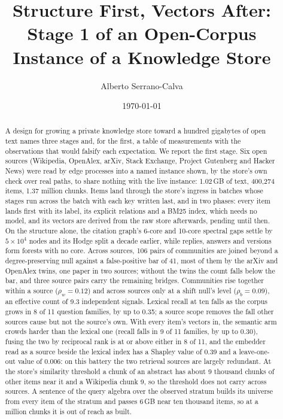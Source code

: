 \documentclass[11pt]{article}
\title{Structure First, Vectors After:\\ Stage 1 of an Open-Corpus Instance of a Knowledge Store}
\author{Alberto Serrano-Calva}
\date{\today}
\theoremstyle{plain}
\theoremstyle{definition}
\theoremstyle{remark}
\begin{document}
\maketitle

\begin{abstract}
A design for growing a private knowledge store toward a hundred gigabytes of open text names three
stages and, for the first, a table of measurements with the observations that would falsify each
expectation. We report the first stage. Six open sources (Wikipedia, OpenAlex, arXiv, Stack Exchange, Project Gutenberg and Hacker News)  were read by edge processes into a named
instance shown, by the store's own check over real paths, to share nothing with the live instance:
1.02\,GB of text, 400,274 items, 1.37 million chunks. Items land through the store's ingress in
batches whose stages run across the batch with each key written last, and in two phases: every item
lands first with its label, its explicit relations and a BM25 index, which needs no model, and its
vectors are derived from the raw store afterwards, pending until then. On the structure alone, the
citation graph's 6-core and 10-core spectral gaps settle by $5\times10^4$ nodes and its Hodge split a
decade earlier, while replies, answers and versions form forests with no core. Across sources, 106
pairs of communities are joined beyond a degree-preserving null against a false-positive bar of 41,
most of them by the arXiv and OpenAlex twins, one paper in two sources; without the twins the count
falls below the bar, and three source pairs carry the remaining bridges. Communities rise together
within a source ($\rho_w = 0.12$) and across sources only at a shift null's level ($\rho_b = 0.09$),
an effective count of 9.3 independent signals. Lexical recall at ten falls as the corpus grows in 8 of
11 question families, by up to 0.35; a source scope removes the fall other sources cause but not the
source's own. With every item's vectors in, the semantic arm crowds harder than the lexical one (recall falls in 9 of 11 families, by up to 0.30), fusing the two by reciprocal rank is at or above either in 8 of 11, and the embedder read as a source beside the lexical index has a Shapley value of 0.39 and a leave-one-out value of 0.006: on this battery the two retrieval sources are largely redundant. At the store's similarity threshold a chunk of an abstract has about 9 thousand chunks of other items near it and a Wikipedia chunk 9, so the threshold does not carry across sources. A sentence of the query algebra over the observed stratum builds its
universe from every item of the stratum and passes 6\,GB near ten thousand items, so at a million
chunks it is out of reach as built.
\end{abstract}
\end{document}
